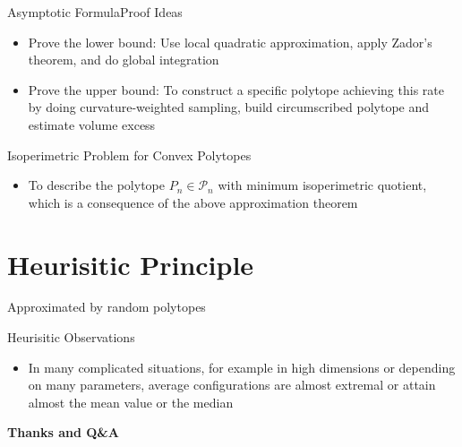 \documentclass[
  english,            %
  aspectratio=169,    %
]{tumbeamer}
\begin{document}
\begin{frame}{Asymptotic Formula}{Proof Ideas}
    \begin{itemize}
        \item Prove the lower bound: Use local quadratic approximation, apply Zador's theorem, and do global integration
        \item Prove the upper bound: To construct a specific polytope achieving this rate by doing curvature-weighted sampling, build circumscribed polytope and estimate volume excess
    \end{itemize}
\end{frame}

\begin{frame}{Isoperimetric Problem for Convex Polytopes}
  \begin{itemize}
    \item To describe the polytope $P_{n} \in \mathcal{P}_{n}$ with minimum isoperimetric quotient, which is a consequence of the above approximation theorem
  \end{itemize}
\end{frame}


\section{Heurisitic Principle}
\begin{frame}{Approximated by random polytopes}
    
\end{frame}
\begin{frame}{Heurisitic Observations}
  \begin{itemize}
    \item In many complicated situations, for example in high dimensions or depending on many parameters, average configurations are almost extremal or attain almost the mean value or the median
  \end{itemize}
\end{frame}

\begin{frame}[plain]
  \centering
  \vfill
  {\Huge \textbf{Thanks and Q\&A}}
  \vfill
\end{frame}
\end{document}
